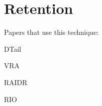 \section{Retention}
\label{sec:ret}
Papers that use this technique:

DTail\cite{dtail}

VRA

RAIDR\cite{raidr}

RIO\cite{rioparis}